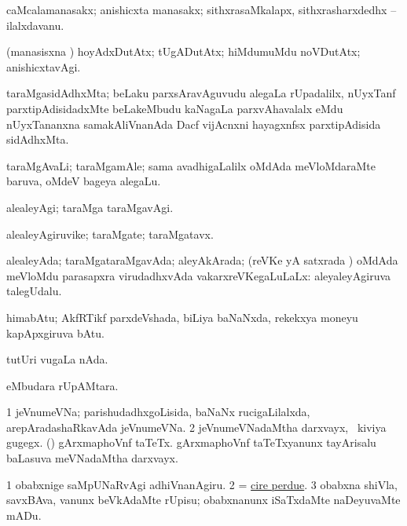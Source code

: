 \bentry
{} 
\gl{\nA}
\expl{}
\bmng
caMcalamanasakx; anishicxta manasakx; sithxrasaMkalapx, sithxrasharxdedhx -- ilalxdavanu. 
\emng
\eentry

\bentry
{} 
\gl{\kirxvi}
\expl{}
\bmng
(manasisxna \vi) hoyAdxDutAtx; tUgADutAtx; hiMdumuMdu noVDutAtx; anishicxtavAgi. 
\emng
\eentry

\bentry
{} 
\gl{\nA}
\expl{}
\bmng
taraMgasidAdhxMta; beLaku parxsAravAguvudu alegaLa rUpadalilx, nUyxTanf parxtipAdisidadxMte beLakeMbudu kaNagaLa parxvAhavalalx eMdu nUyxTananxna samakAliVnanAda Dacf vijAcnxni hayagxnfsx parxtipAdisida sidAdhxMta. 
\emng
\eentry

\bentry
{} 
\gl{\nA}
\expl{}
\bmng
taraMgAvaLi; taraMgamAle; sama avadhigaLalilx oMdAda meVloMdaraMte baruva, oMdeV bageya alegaLu. 
\emng
\eentry

\bentry
{} 
\gl{\kirxvi}
\expl{}
\bmng
alealeyAgi; taraMga taraMgavAgi. 
\emng
\eentry

\bentry
{} 
\gl{\nA}
\expl{}
\bmng
alealeyAgiruvike; taraMgate; taraMgatavx. 
\emng
\eentry

\bentry
{} 
\gl{\gu}
\bmng
alealeyAda; taraMgataraMgavAda; aleyAkArada; (reVKe yA satxrada \vi) oMdAda meVloMdu parasapxra virudadhxvAda vakarxreVKegaLuLaLx:  aleyaleyAgiruva talegUdalu. 
\emng
\eentry

\bentry
{} 
\gl{\nA}
\expl{}
\bmng
himabAtu; AkfRTikf parxdeVshada, biLiya baNaNxda, rekekxya moneyu kapApxgiruva bAtu. 
\emng
\eentry

\bentry
{} 
\gl{\nA}
\expl{}
\bmng
tutUri \mo vugaLa nAda. 
\emng
\eentry

\bentry
{} 
\gl{\akirx}
\expl{}
\bmng
{} eMbudara rUpAMtara. 
\emng
\eentry

\bentry
{}
\gl{\nA}
\bmng
\bnum
\num{1} jeVnumeVNa; parishudadhxgoLisida, baNaNx rucigaLilalxda, arepAradashaRkavAda jeVnumeVNa. 
\num{2} jeVnumeVNadaMtha darxvayx, \udA\ kiviya gugegx. 
 (\AmA) 
\banum
{} gArxmaphoVnf taTeTx. 
 gArxmaphoVnf taTeTxyanunx tayArisalu baLasuva meVNadaMtha darxvayx. 
\eanum
\numie
\enum
\emng

\noindent 
\gl{\pagu}
\expl{}
\bmng
\bnum
\num{1}  obabxnige saMpUNaRvAgi adhiVnanAgiru. 
\num{2}  = \hyperref{kandict_c.pdf}{C}{cire perdue}{cire perdue}. 
\num{3}  obabxna shiVla, savxBAva, \mo vanunx beVkAdaMte rUpisu; obabxnanunx iSaTxdaMte naDeyuvaMte mADu. 
\enum
\emng
\eentry


